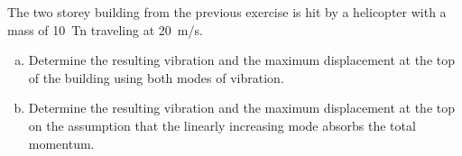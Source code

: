 
\begin{Exercise}[label={two_storey_helicopter}]
The two storey building from the previous exercise is hit by a helicopter with a mass of \qty{10}{Tn} traveling at \qty{20}{m/s}.
\begin{enumerate}[(a)]
    \item Determine the resulting vibration and the maximum displacement at the top of the building using both modes of vibration.
    \item Determine the resulting vibration and the maximum displacement at the top on the assumption that the linearly increasing mode absorbs the total momentum.
\end{enumerate}
\shortAnswer
\end{Exercise}



\begin{Answer}[ref={two_storey_helicopter}]
\end{Answer}
